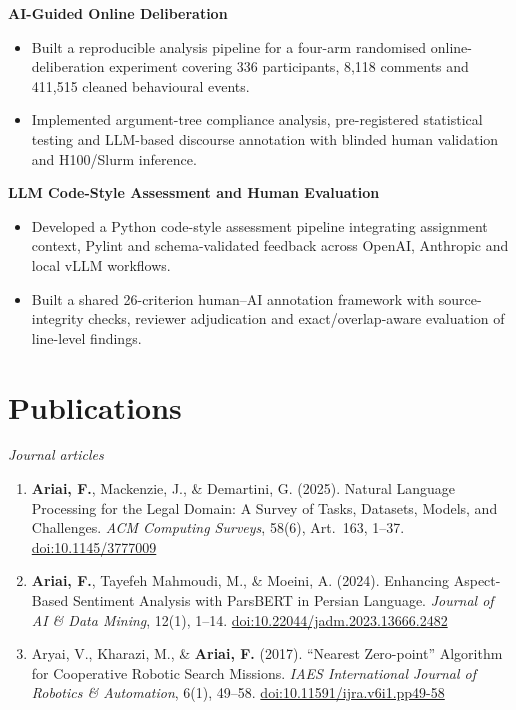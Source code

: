 \documentclass[11pt, a4paper]{article}
\newcommand{\me}{\textbf{Ariai, F.}}
\begin{document}
\begin{minipage}{\linewidth}
\textbf{AI-Guided Online Deliberation}
\begin{itemize}
  \item Built a reproducible analysis pipeline for a four-arm randomised online-deliberation experiment covering 336 participants, 8,118 comments and 411,515 cleaned behavioural events.
  \item Implemented argument-tree compliance analysis, pre-registered statistical testing and LLM-based discourse annotation with blinded human validation and H100/Slurm inference.
\end{itemize}
\end{minipage}\par\vspace{6pt}

\begin{minipage}{\linewidth}
\textbf{LLM Code-Style Assessment and Human Evaluation}
\begin{itemize}
  \item Developed a Python code-style assessment pipeline integrating assignment context, Pylint and schema-validated feedback across OpenAI, Anthropic and local vLLM workflows.
  \item Built a shared 26-criterion human--AI annotation framework with source-integrity checks, reviewer adjudication and exact/overlap-aware evaluation of line-level findings.
\end{itemize}
\end{minipage}\par\vspace{6pt}

\section{Publications}
\textit{\small Journal articles}
\begin{enumerate}[leftmargin=1.5em, itemsep=4pt, topsep=2pt, start=1]
  \item \me{}, Mackenzie, J., \& Demartini, G. (2025). Natural Language Processing for the Legal Domain: A Survey of Tasks, Datasets, Models, and Challenges. \textit{ACM Computing Surveys}, 58(6), Art.~163, 1--37. \href{https://doi.org/10.1145/3777009}{doi:10.1145/3777009}
  \item \me{}, Tayefeh Mahmoudi, M., \& Moeini, A. (2024). Enhancing Aspect-Based Sentiment Analysis with ParsBERT in Persian Language. \textit{Journal of AI \& Data Mining}, 12(1), 1--14. \href{https://doi.org/10.22044/jadm.2023.13666.2482}{doi:10.22044/jadm.2023.13666.2482}
  \item Aryai, V., Kharazi, M., \& \me{} (2017). ``Nearest Zero-point'' Algorithm for Cooperative Robotic Search Missions. \textit{IAES International Journal of Robotics \& Automation}, 6(1), 49--58. \href{https://doi.org/10.11591/ijra.v6i1.pp49-58}{doi:10.11591/ijra.v6i1.pp49-58}
\end{enumerate}
\end{document}
